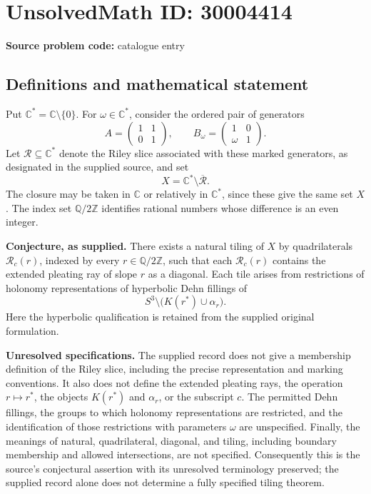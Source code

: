 \documentclass[11pt]{article}
\newcommand{\Z}{\mathbb{Z}}
\newcommand{\Q}{\mathbb{Q}}
\newcommand{\C}{\mathbb{C}}
\begin{document}
\section*{UnsolvedMath ID: 30004414}
\textbf{Source problem code:} catalogue entry
\subsection{Definitions and mathematical statement}
Put \(\C^*=\C\setminus\{0\}\). For \(\omega\in\C^*\), consider the ordered pair of generators
\[
A=\begin{pmatrix}1&1\\0&1\end{pmatrix},\qquad B_\omega=\begin{pmatrix}1&0\\\omega&1\end{pmatrix}.
\]
Let \(\mathcal R\subseteq\C^*\) denote the Riley slice associated with these marked generators, as designated in the supplied source, and set
\[
X=\C^*\setminus\overline{\mathcal R}.
\]
The closure may be taken in \(\C\) or relatively in \(\C^*\), since these give the same set \(X\). The index set \(\Q/2\Z\) identifies rational numbers whose difference is an even integer.

\textbf{Conjecture, as supplied.} There exists a natural tiling of \(X\) by quadrilaterals \(\mathcal R_c(r)\), indexed by every \(r\in\Q/2\Z\), such that each \(\mathcal R_c(r)\) contains the extended pleating ray of slope \(r\) as a diagonal. Each tile arises from restrictions of holonomy representations of hyperbolic Dehn fillings of
\[
S^3\setminus\bigl(K(r^*)\cup\alpha_r\bigr).
\]
Here the hyperbolic qualification is retained from the supplied original formulation.

\textbf{Unresolved specifications.} The supplied record does not give a membership definition of the Riley slice, including the precise representation and marking conventions. It also does not define the extended pleating rays, the operation \(r\mapsto r^*\), the objects \(K(r^*)\) and \(\alpha_r\), or the subscript \(c\). The permitted Dehn fillings, the groups to which holonomy representations are restricted, and the identification of those restrictions with parameters \(\omega\) are unspecified. Finally, the meanings of natural, quadrilateral, diagonal, and tiling, including boundary membership and allowed intersections, are not specified. Consequently this is the source's conjectural assertion with its unresolved terminology preserved; the supplied record alone does not determine a fully specified tiling theorem.
\end{document}
